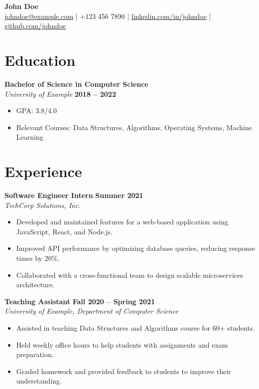 \documentclass[a4paper,10pt]{article}
\begin{document}
\begin{center}
    {\LARGE \textbf{John Doe}} \\
    \vspace{5pt}
    \href{mailto:johndoe@example.com}{johndoe@example.com} | +123 456 7890 | \href{https://linkedin.com/in/johndoe}{linkedin.com/in/johndoe} | \href{https://github.com/johndoe}{github.com/johndoe}
\end{center}

\vspace{15pt}

\section*{Education}
\noindent\textbf{Bachelor of Science in Computer Science} \\
\textit{University of Example} \hfill \textbf{2018 -- 2022} \\
\begin{itemize}[leftmargin=*]
    \item GPA: 3.8/4.0
    \item Relevant Courses: Data Structures, Algorithms, Operating Systems, Machine Learning
\end{itemize}

\section*{Experience}
\noindent\textbf{Software Engineer Intern} \hfill \textbf{Summer 2021} \\
\textit{TechCorp Solutions, Inc.} \\
\begin{itemize}[leftmargin=*]
    \item Developed and maintained features for a web-based application using JavaScript, React, and Node.js.
    \item Improved API performance by optimizing database queries, reducing response times by 20\%.
    \item Collaborated with a cross-functional team to design scalable microservices architecture.
\end{itemize}

\noindent\textbf{Teaching Assistant} \hfill \textbf{Fall 2020 -- Spring 2021} \\
\textit{University of Example, Department of Computer Science} \\
\begin{itemize}[leftmargin=*]
    \item Assisted in teaching Data Structures and Algorithms course for 60+ students.
    \item Held weekly office hours to help students with assignments and exam preparation.
    \item Graded homework and provided feedback to students to improve their understanding.
\end{itemize}
\end{document}

